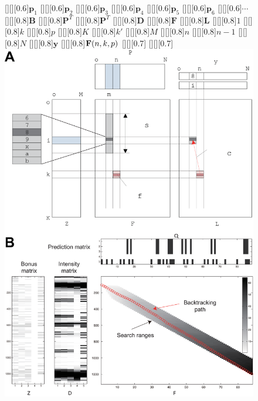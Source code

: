 \begin{figure}
\centering
	[][][0.6]{$\mathbf{p}_1$}
	[][][0.6]{$\mathbf{p}_2$}
	[][][0.6]{$\mathbf{p}_3$}
	[][][0.6]{$\mathbf{p}_4$}
	[][][0.6]{$\mathbf{p}_5$}
	[][][0.6]{$\mathbf{p}_6$}				
	[][][0.6]{$\cdots$}				
	[][][0.8]{$\mathbf{B}$}
	[][][0.8]{$\mathbf{P}^T$}
	[][][0.8]{$\mathbf{P}^T$}
	[][][0.8]{$\mathbf{D}$}
	[][][0.8]{$\mathbf{F}$}
	[][][0.8]{$\mathbf{L}$}
	[][][0.8]{$1$}
	[][][0.8]{$k$}
	[][][0.8]{$p$}
	[][][0.8]{$K$}
	[][][0.8]{$k'$}
	[][][0.8]{$M$}
	[][][0.8]{$n$}
	[][][0.8]{$n-1$}
	[][][0.8]{$N$}
	[][][0.8]{$\mathbf{y}$}
	[][][0.8]{${\mathbf{F}}(n,k,p)$}
	[][][0.7]{}
	[][][0.7]{}
\includegraphics[width=0.85\linewidth]{figures/Figure3}

\end{figure}

